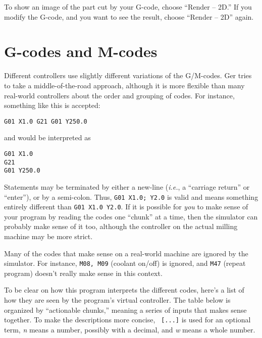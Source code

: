 \documentclass[titlepage,oneside,10pt]{article}
\begin{document}
To show an image of the part cut by your G-code, choose ``Render --
2D.'' If you modify the G-code, and you want to see the result,
choose ``Render -- 2D'' again.

\section{G-codes and M-codes}

Different controllers use slightly different variations of the
G/M-codes. Ger tries to take a middle-of-the-road approach, although
it is more flexible than many real-world controllers about the order
and grouping of codes. For instance, something like this is accepted:
\begin{verbatim}
G01 X1.0 G21 G01 Y250.0
\end{verbatim}
and would be interpreted as
\begin{verbatim}
G01 X1.0 
G21 
G01 Y250.0
\end{verbatim}
Statements may be terminated by either a new-line (\emph{i.e.}, a
``carriage return'' or ``enter''), or by a semi-colon. Thus, {\tt G01
  X1.0; Y2.0} is valid and 
means something entirely different than {\tt G01 X1.0 Y2.0}.  If it is
possible for \emph{you} to make sense of your program by 
reading the codes one ``chunk'' at a time, then the simulator can
probably make sense of it too, although the controller on the actual
milling machine may be more strict. 

Many of the codes that make sense on a real-world machine are
ignored by the simulator. For instance, {\tt M08, M09} (coolant
on/off) is ignored, and {\tt M47} (repeat program) doesn't really make
sense in this context.

To be clear on how this program interprets the different codes, here's
a list of how they are seen by the program's virtual controller. The
table below is organized by ``actionable chunks,'' meaning a series of inputs
that makes sense together. To make the descriptions more concise, {\tt
  [...]} is used for an optional term, \emph{n} means a number,
possibly with a decimal, and \emph{w} means a whole number.
\end{document}
